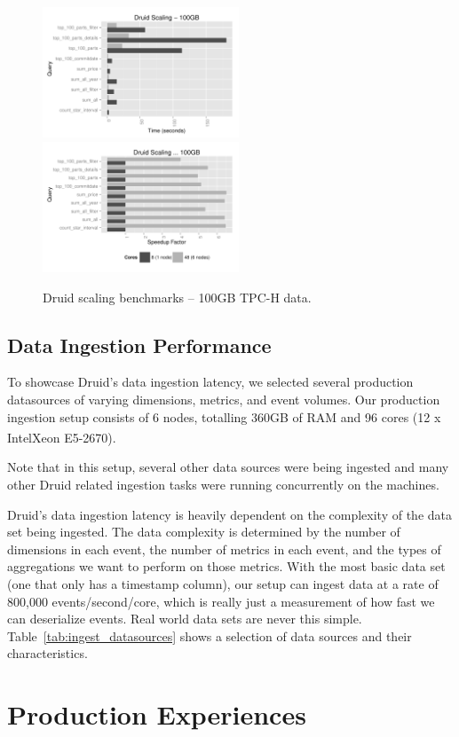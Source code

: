 \documentclass{vldb}
\begin{document}
{\begin{figure}
\centering
\includegraphics[width = 2.3in]{tpch_scaling}
\includegraphics[width = 2.3in]{tpch_scaling_factor}
\caption{Druid scaling benchmarks -- 100GB TPC-H data.}
\label{fig:tpch_scaling}
\end{figure}

\subsection{Data Ingestion Performance}
To showcase Druid's data ingestion latency, we selected several production
datasources of varying dimensions, metrics, and event volumes. Our production
ingestion setup consists of 6 nodes, totalling 360GB of RAM and 96 cores (12 x
Intel\textsuperscript\textregistered Xeon\textsuperscript\textregistered
E5-2670).

Note that in this setup, several other data sources were being ingested and
many other Druid related ingestion tasks were running concurrently on the
machines.

Druid's data ingestion latency is heavily dependent on the complexity of the
data set being ingested. The data complexity is determined by the number of
dimensions in each event, the number of metrics in each event, and the types of
aggregations we want to perform on those metrics. With the most basic data set
(one that only has a timestamp column), our setup can ingest data at a rate of
800,000 events/second/core, which is really just a measurement of how fast we
can deserialize events. Real world data sets are never this simple.
Table~\ref{tab:ingest_datasources} shows a selection of data sources and their
characteristics.

\section{Production Experiences}
\label{sec:experiences}

}
\end{document}
